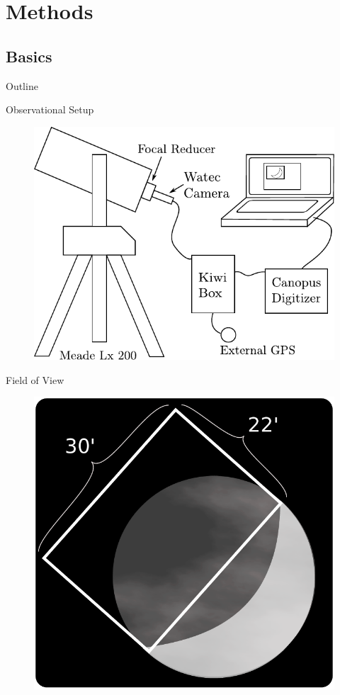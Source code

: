 \documentclass[pdf]{beamer}
\begin{document}
\section{Methods}

\subsection{Basics}

 \begin{frame}{Outline}
   \tableofcontents[currentsection]
 \end{frame}

\begin{frame}{Observational Setup}
  \begin{figure}[ht!]
	\centering
	\includegraphics[width=.75\textwidth]{Images/equipment_setup2.pdf}
  \end{figure}
\end{frame}

\begin{frame}{Field of View}
  \begin{figure}[h!]
	\centering
	\includegraphics[width=.65\textwidth]{Images/fieldofview2.pdf}
  \end{figure}
\end{frame}
\end{document}
